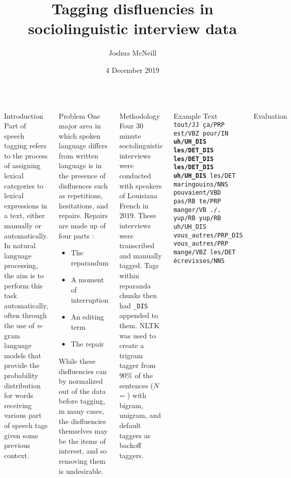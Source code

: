 \documentclass{beamer}\usepackage[]{graphicx}\usepackage[]{color}
\title{Tagging disfluencies in sociolinguistic interview data}
\author{Joshua McNeill}
\institute{University of Georgia}
\date{4 December 2019}
\begin{document}
  \begin{frame}[t]{}
    \begin{columns}
        \begin{block}{Introduction}
          Part of speech tagging refers to the process of assigning lexical categories to lexical expressions in a text, either manually or automatically.
          In natural language processing, the aim is to perform this task automatically, often through the use of \emph{n}-gram language models that provide the probability distribution for words receiving various part of speech tags given some previous context.
        \end{block}
        \begin{block}{Problem}
          One major area in which spoken language differs from written language is in the presence of disfluences such as repetitions, hesitations, and repairs.
          Repairs are made up of four parts \parencite{levelt_monitoring_1983}:
          \begin{itemize}
            \item The reparandum
            \item A moment of interruption
            \item An editing term
            \item The repair
          \end{itemize}
          While these disfluencies can by normalized out of the data before tagging, in many cases, the disfluencies themselves may be the items of interest, and so removing them is undesirable.
        \end{block}
        \begin{block}{Methodology}
          Four 30 minute sociolinguistic interviews were conducted with speakers of Louisiana French in 2019.
          These interviews were transcribed and manually tagged.
          Tags within reparanda chunks then had \texttt{\_DIS} appended to them.
          NLTK was used to create a trigram tagger from 90\% of the sentences ($N$ = ) with bigram, unigram, and default taggers as backoff taggers.
        \end{block}
        \begin{block}{Example Text}
          \texttt{tout/JJ ça/PRP est/VBZ pour/IN \textbf{uh/UH\_DIS les/DET\_DIS les/DET\_DIS les/DET\_DIS uh/UH\_DIS} les/DET maringouins/NNS pouvaient/VBD pas/RB te/PRP manger/VB ./. yup/RB yup/RB uh/UH\_DIS vous\_autres/PRP\_DIS vous\_autres/PRP mange/VBZ les/DET écrevisses/NNS}
        \end{block}
        \begin{block}{Evaluation}
          \parbox{0.45\linewidth}{

}
\end{block}
\end{columns}
\end{frame}
\end{document}
